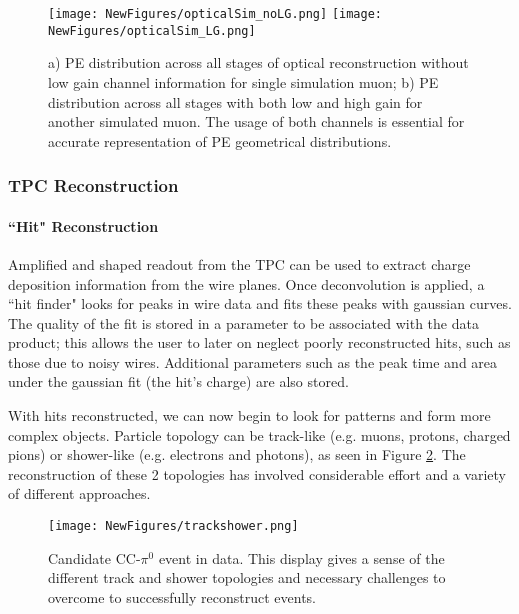 \documentclass[12pt]{article}
\begin{document}
\begin{figure}[h!]
\centering
\texttt{[image: NewFigures/opticalSim\_noLG.png]}
\hspace{2 mm}
\texttt{[image: NewFigures/opticalSim\_LG.png]}
\caption{a) PE distribution across all stages of optical reconstruction without low gain channel information for single simulation muon; b) PE distribution across all stages with both low and high gain for another simulated muon. The usage of both channels is essential for accurate representation of PE geometrical distributions. }
\label{fig:pedistrib}
\end{figure}

\subsubsection{TPC Reconstruction}
\paragraph{``Hit" Reconstruction}
Amplified and shaped readout from the TPC can be used to extract charge deposition information from the wire planes.  Once deconvolution is applied, a ``hit finder" looks for peaks in wire data and fits these peaks with gaussian curves.  The quality of the fit is stored in a parameter to be associated with the data product; this allows the user to later on neglect poorly reconstructed hits, such as those due to noisy wires.  Additional parameters such as the peak time and area under the gaussian fit (the hit's charge) are also stored.  

\par With hits reconstructed, we can now begin to look for patterns and form more complex objects. Particle topology can be track-like (e.g. muons, protons, charged pions) or shower-like (e.g. electrons and photons), as seen in Figure \ref{fig:trackshower}. The reconstruction of these 2 topologies has involved considerable effort and a variety of different approaches.  

\begin{figure}[h!]
\centering
\texttt{[image: NewFigures/trackshower.png]}
\caption{Candidate CC-$\pi^0$ event in data. This display gives a sense of the different track and shower topologies and necessary challenges to overcome to successfully reconstruct events.} 
\label{fig:trackshower}
\end{figure}
\end{document}
